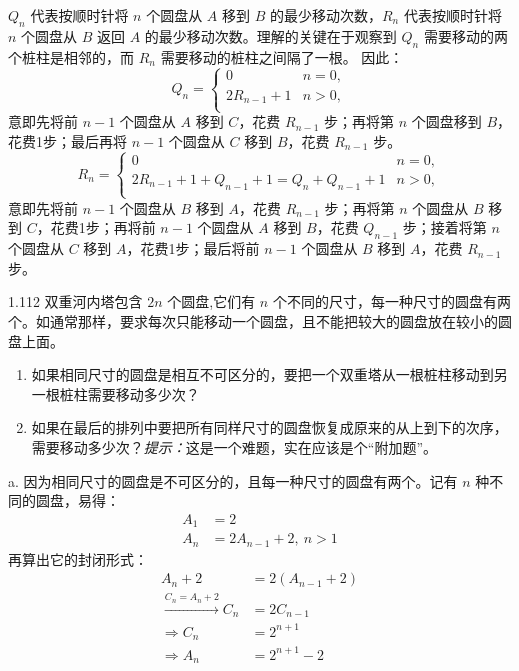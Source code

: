 \( Q_n \) 代表按顺时针将 \( n \) 个圆盘从 \( A \) 移到 \( B \) 的最少移动次数，\( R_n \) 代表按顺时针将 \( n \) 个圆盘从 \( B \) 返回 \( A \) 的最少移动次数。理解的关键在于观察到 \( Q_n \) 需要移动的两个桩柱是相邻的，而 \( R_n \) 需要移动的桩柱之间隔了一根。
因此：
\begin{equation*}
  Q_n =
  \begin{cases} 0 & n = 0, \\
    2R_{n-1} + 1 & n > 0, \\
  \end{cases}
\end{equation*}
意即先将前 \( n-1 \) 个圆盘从 \( A \) 移到 \( C \)，花费 \( R_{n-1} \) 步；再将第 \( n \) 个圆盘移到 \( B \)，花费1步；最后再将 \( n-1 \) 个圆盘从 \( C \) 移到 \( B \)，花费 \( R_{n-1} \) 步。
\begin{equation*}
  R_n=
  \begin{cases} 0 & n = 0, \\
    2R_{n-1} + 1 + Q_{n-1} + 1 = Q_n + Q_{n-1} + 1 & n > 0, \\
  \end{cases}
\end{equation*}
意即先将前 \( n-1 \) 个圆盘从 \( B \) 移到 \( A \)，花费 \( R_{n-1} \) 步；再将第 \( n \) 个圆盘从 \( B \) 移到 \( C \)，花费1步；再将前 \( n-1 \) 个圆盘从 \( A \) 移到 \( B \)，花费 \( Q_{n-1} \) 步；接着将第 \( n \) 个圆盘从 \( C \) 移到 \( A \)，花费1步；最后将前 \( n-1 \) 个圆盘从 \( B \) 移到 \( A \)，花费 \( R_{n-1} \) 步。

\begin{problem}{1.11}{2}
  双重河内塔包含 \( 2n \) 个圆盘,它们有 \( n \) 个不同的尺寸，每一种尺寸的圆盘有两个。如通常那样，要求每次只能移动一个圆盘，且不能把较大的圆盘放在较小的圆盘上面。

  \begin{enumerate}
    \item[a] 如果相同尺寸的圆盘是相互不可区分的，要把一个双重塔从一根桩柱移动到另一根桩柱需要移动多少次？
    \item[b] 如果在最后的排列中要把所有同样尺寸的圆盘恢复成原来的从上到下的次序，需要移动多少次？\textit{提示：}这是一个难题，实在应该是个“附加题”。
  \end{enumerate}
\end{problem}

a. 因为相同尺寸的圆盘是不可区分的，且每一种尺寸的圆盘有两个。记有 \( n \) 种不同的圆盘，易得：
\begin{align*}
  A_1 &= 2 \\
  A_n &= 2 A_{n-1} + 2, \ n > 1
\end{align*}
再算出它的封闭形式：
\begin{align*}
  A_n + 2 &= 2(A_{n-1} + 2) \\
  \xrightarrow{C_n = A_n + 2} C_n &= 2 C_{n-1} \\
  \Rightarrow C_n &= 2^{n+1} \\
  \Rightarrow A_n &= 2^{n+1} - 2
\end{align*}

